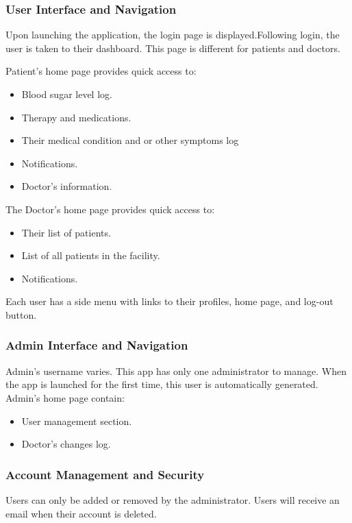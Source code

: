 \documentclass[10pt, titlepage]{article}
\begin{document}
    \subsubsection{User Interface and Navigation}
    Upon launching the application, the login page is displayed.Following login, the user is taken to their dashboard. This page is different for patients and doctors.

    Patient's home page provides quick access to:
    \begin{itemize}
        \item Blood sugar level log.
        \item Therapy and medications.
        \item Their medical condition and or other symptoms log
        \item Notifications.
        \item Doctor's information.
    \end{itemize}

    The Doctor's home page provides quick access to:
    \begin{itemize}
        \item Their list of patients.
        \item List of all patients in the facility.
        \item Notifications.
    \end{itemize}

    Each user has a side menu with links to their profiles, home page, and log-out button.

    \subsubsection{Admin Interface and Navigation}
    Admin's username varies. This app has only one administrator to manage. When the app is launched for the first time, this user is automatically generated.
    Admin's home page contain:
    \begin{itemize}
        \item User management section.
        \item Doctor's changes log.
    \end{itemize}

    \subsubsection{Account Management and Security}
    Users can only be added or removed by the administrator. Users will receive an email when their account is deleted.
    
\end{document}
